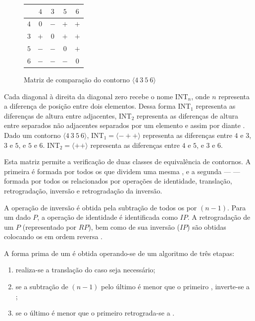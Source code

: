 \begin{figure}
  \centering
  \begin{tabular}{r|cccc}
    & $4$ & $3$ & $5$ & $6$ \\
    \hline
    $4$ & $0$ & $-$ & $+$ & $+$ \\
    $3$ & $+$ & $0$ & $+$ & $+$ \\
    $5$ & $-$ & $-$ & $0$ & $+$ \\
    $6$ & $-$ & $-$ & $-$ & $0$ \\
  \end{tabular}
  \caption{Matriz de comparação do contorno $\langle 4\:3\:5\:6 \rangle$}
  \label{fig:matriz-4356}
\end{figure}

Cada diagonal à direita da diagonal zero recebe o nome INT$_n$, onde
$n$ representa a diferença de posição entre dois elementos. Dessa
forma INT$_1$ representa as diferenças de altura entre 
adjacentes, INT$_2$ representa as diferenças de altura entre
 separados não adjacentes separados por um elemento e
assim por diante \cite[p. 231]{marvin.ea87:relating}. Dado um contorno
$\langle 4\:3\:5\:6 \rangle$, INT$_1 = \langle - + +\rangle$
representa as diferenças entre $4$ e $3$, $3$ e $5$, e $5$ e
$6$. INT$_2 = \langle + + \rangle$ representa as diferenças entre $4$
e $5$, e $3$ e $6$.

Esta matriz permite a verificação de duas classes de equivalência de
contornos. A primeira é formada por todos os  que dividem uma
mesma , e a segunda ---  --- formada por
todos os  relacionados por operações de identidade,
translação, retrogradação, inversão e retrogradação da inversão.

A operação de inversão é obtida pela subtração de todos os 
por $(n-1)$. Para um dado  $P$, a operação de identidade é
identificada como $IP$. A retrogradação de um  $P$
(representado por $RP$), bem como de sua inversão ($IP$) são obtidas
colocando os  em ordem reversa
\cite[p. 231]{marvin.ea87:relating}.

A forma prima de um  é obtida operando-se de um algoritmo de
três etapas:
\begin{enumerate}
\item realiza-se a translação do  caso seja necessário;
\item se a subtração de $(n-1)$ pelo último  é menor
  que o primeiro , inverte-se a ;
\item se o último  é menor que o primeiro
   retrograda-se a .
\end{enumerate}

